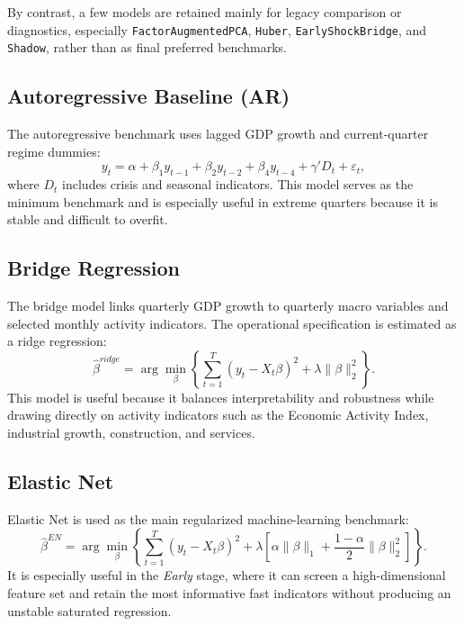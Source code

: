 \documentclass[12pt,a4paper]{article}
\begin{document}
By contrast, a few models are retained mainly for legacy comparison or diagnostics, especially \texttt{FactorAugmentedPCA}, \texttt{Huber}, \texttt{EarlyShockBridge}, and \texttt{Shadow}, rather than as final preferred benchmarks.

\subsection{Autoregressive Baseline (AR)}

The autoregressive benchmark uses lagged GDP growth and current-quarter regime dummies:
\begin{equation}
    y_t = \alpha + \beta_1 y_{t-1} + \beta_2 y_{t-2} + \beta_4 y_{t-4} + \gamma' D_t + \varepsilon_t,
\end{equation}
where $D_t$ includes crisis and seasonal indicators. This model serves as the minimum benchmark and is especially useful in extreme quarters because it is stable and difficult to overfit.

\subsection{Bridge Regression}

The bridge model links quarterly GDP growth to quarterly macro variables and selected monthly activity indicators. The operational specification is estimated as a ridge regression:
\begin{equation}
    \hat{\beta}^{ridge} = \arg\min_{\beta} \left\{ \sum_{t=1}^{T}(y_t - X_t \beta)^2 + \lambda \|\beta\|_2^2 \right\}.
\end{equation}
This model is useful because it balances interpretability and robustness while drawing directly on activity indicators such as the Economic Activity Index, industrial growth, construction, and services.

\subsection{Elastic Net}

Elastic Net is used as the main regularized machine-learning benchmark:
\begin{equation}
    \hat{\beta}^{EN} = \arg\min_{\beta} \left\{ \sum_{t=1}^{T}(y_t - X_t \beta)^2 + \lambda \left[ \alpha \|\beta\|_1 + \frac{1-\alpha}{2}\|\beta\|_2^2 \right] \right\}.
\end{equation}
It is especially useful in the \textit{Early} stage, where it can screen a high-dimensional feature set and retain the most informative fast indicators without producing an unstable saturated regression.
\end{document}
